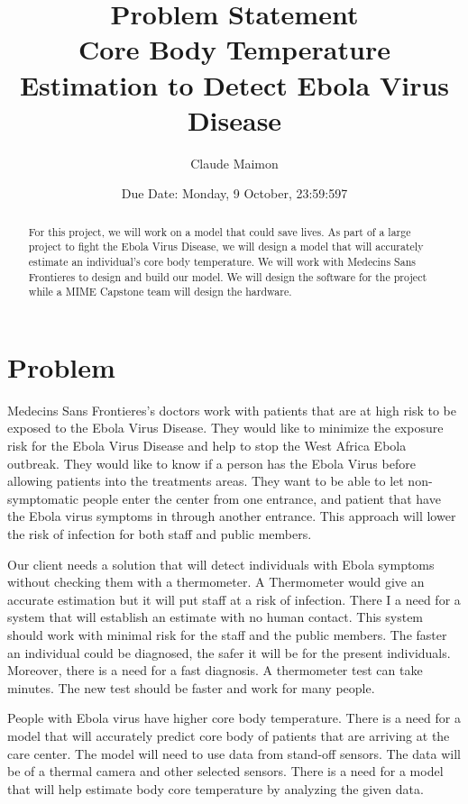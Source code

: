 \documentclass{article}
\title{%
  Problem Statement \\
  \large Core Body Temperature Estimation to Detect Ebola Virus Disease \\
    }
\author{Claude Maimon }
\date{Due Date: Monday, 9 October, 23:59:597}
\begin{document}
\maketitle


\begin{abstract}
For this project, we will work on a model that could save lives. As part of a large project to fight the Ebola Virus Disease, we will design a model that will accurately estimate an individual’s core body temperature. We will work with Medecins Sans Frontieres to design and build our model. We will design the software for the project while a MIME Capstone team will design the hardware.  \end{abstract}

\section{Problem}
Medecins Sans Frontieres’s doctors work with patients that are at high risk to be exposed to the Ebola Virus Disease. They would like to minimize the exposure risk for the Ebola Virus Disease and help to stop the West Africa Ebola outbreak. They would like to know if a person has the Ebola Virus before allowing patients into the treatments areas. They want to be able to let non-symptomatic people enter the center from one entrance, and patient that have the Ebola virus symptoms in through another entrance. This approach will lower the risk of infection for both staff and public members.\par 
Our client needs a solution that will detect individuals with Ebola symptoms without checking them with a thermometer. A Thermometer would give an accurate estimation but it will put staff at a risk of infection. There I a need for a system that will establish an estimate with no human contact. This system should work with minimal risk for the staff and the public members. The faster an individual could be diagnosed, the safer it will be for the present individuals. Moreover, there is a need for a fast diagnosis. A thermometer test can take minutes. The new test should be faster and work for many people. \par
People with Ebola virus have higher core body temperature. There is a need for a model that will accurately predict core body of patients that are arriving at the care center. The model will need to use data from stand-off sensors. The data will be of a thermal camera and other selected sensors. There is a need for a model that will help estimate body core temperature by analyzing the given data.   
\end{document}
